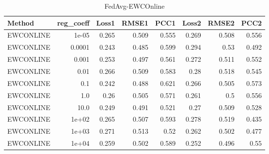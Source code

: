 \begin{table}
\caption{FedAvg-EWCOnline}
\begin{tabular}{lrrrrrrr}
\toprule
Method & reg_coeff & Loss1 & RMSE1 & PCC1 & Loss2 & RMSE2 & PCC2 \\
\midrule
EWCONLINE & 1e-05 & 0.265 & 0.509 & 0.555 & 0.269 & 0.508 & 0.556 \\
EWCONLINE & 0.0001 & 0.243 & 0.485 & 0.599 & 0.294 & 0.53 & 0.492 \\
EWCONLINE & 0.001 & 0.253 & 0.497 & 0.561 & 0.272 & 0.511 & 0.552 \\
EWCONLINE & 0.01 & 0.266 & 0.509 & 0.583 & 0.28 & 0.518 & 0.545 \\
EWCONLINE & 0.1 & 0.242 & 0.488 & 0.621 & 0.266 & 0.505 & 0.573 \\
EWCONLINE & 1.0 & 0.26 & 0.505 & 0.571 & 0.261 & 0.5 & 0.556 \\
EWCONLINE & 10.0 & 0.249 & 0.491 & 0.521 & 0.27 & 0.509 & 0.528 \\
EWCONLINE & 1e+02 & 0.265 & 0.507 & 0.593 & 0.278 & 0.519 & 0.435 \\
EWCONLINE & 1e+03 & 0.271 & 0.513 & 0.52 & 0.262 & 0.502 & 0.477 \\
EWCONLINE & 1e+04 & 0.259 & 0.502 & 0.589 & 0.252 & 0.496 & 0.55 \\
\bottomrule
\end{tabular}
\end{table}
